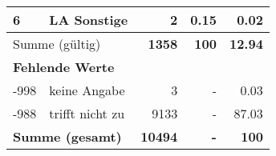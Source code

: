 \begin{longtable}{lXrrr}
     6 &
     \multicolumn{1}{X}{ LA Sonstige   } &


       \num{2} &
       \num[round-mode=places,round-precision=2]{0,15} &
         \num[round-mode=places,round-precision=2]{0,02} \\
     \midrule
     \multicolumn{2}{l}{Summe (gültig)} &
       \textbf{\num{1358}} &
     \textbf{100} &
       \textbf{\num[round-mode=places,round-precision=2]{12,94}} \\
     \multicolumn{5}{l}{\textbf{Fehlende Werte}}\\
       -998 &
       keine Angabe &
         \num{3} &
        - &
         \num[round-mode=places,round-precision=2]{0,03} \\
       -988 &
       trifft nicht zu &
         \num{9133} &
        - &
         \num[round-mode=places,round-precision=2]{87,03} \\
     \midrule
     \multicolumn{2}{l}{\textbf{Summe (gesamt)}} &
          \textbf{\num{10494}} &
        \textbf{-} &
        \textbf{100} \\
     \bottomrule
     \end{longtable}
     

